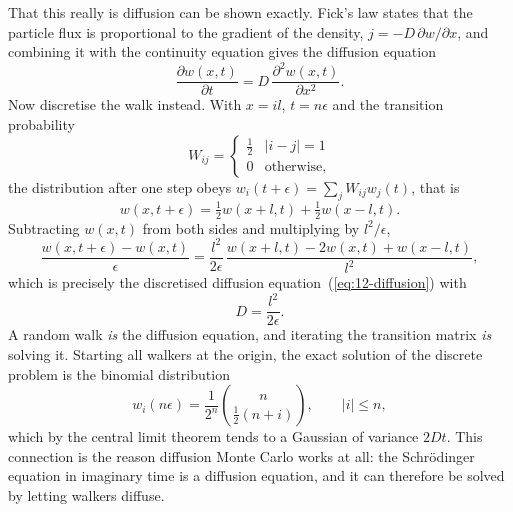 That this really is diffusion can be shown exactly.  Fick's law states that
the particle flux is proportional to the gradient of the density,
$j=-D\,\partial w/\partial x$, and combining it with the continuity equation
gives the diffusion equation
\begin{equation}
  \frac{\partial w(x,t)}{\partial t}
   = D\,\frac{\partial^2 w(x,t)}{\partial x^2}.
  \label{eq:12-diffusion}
\end{equation}
Now discretise the walk instead.  With $x=il$, $t=n\epsilon$ and the
transition probability
\begin{equation}
  W_{ij} = \begin{cases}\tfrac12 & |i-j|=1\\ 0 & \text{otherwise,}\end{cases}
  \label{eq:12-walktransition}
\end{equation}
the distribution after one step obeys $w_i(t+\epsilon)=\sum_j W_{ij}w_j(t)$,
that is
\begin{equation}
  w(x,t+\epsilon) = \tfrac12 w(x+l,t) + \tfrac12 w(x-l,t).
  \label{eq:12-walkrecursion}
\end{equation}
Subtracting $w(x,t)$ from both sides and multiplying by $l^2/\epsilon$,
\begin{equation}
  \frac{w(x,t+\epsilon)-w(x,t)}{\epsilon}
   = \frac{l^2}{2\epsilon}\,
     \frac{w(x+l,t)-2w(x,t)+w(x-l,t)}{l^2},
  \label{eq:12-walktodiffusion}
\end{equation}
which is precisely the discretised diffusion
equation~(\ref{eq:12-diffusion}) with
\begin{equation}
  D = \frac{l^2}{2\epsilon}.
  \label{eq:12-diffusioncoefficient}
\end{equation}
A random walk \emph{is} the diffusion equation, and iterating the transition
matrix \emph{is} solving it.  Starting all walkers at the origin, the exact
solution of the discrete problem is the binomial distribution
\begin{equation}
  w_i(n\epsilon) = \frac{1}{2^n}\binom{n}{\tfrac12(n+i)},
  \qquad |i|\le n ,
  \label{eq:12-binomial}
\end{equation}
which by the central limit theorem tends to a Gaussian of variance $2Dt$.
This connection is the reason diffusion Monte Carlo works at all: the
Schr\"odinger equation in imaginary time is a diffusion equation, and it can
therefore be solved by letting walkers diffuse.

